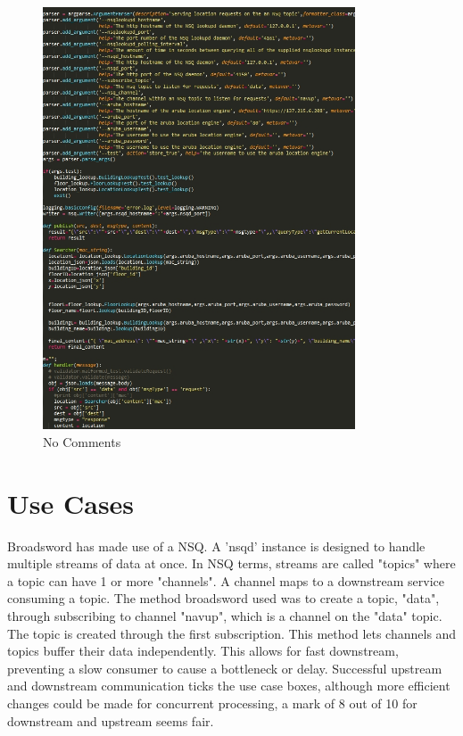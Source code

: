 \documentclass{article}
\begin{document}
\begin{figure}[ht]
  \includegraphics[width=350px]{Images/nocomments.jpg}
  \caption{No Comments}
  \label{Figure showing the lack of comments and explanation}
\end{figure}

\section{Use Cases}

\begin{flushleft}
Broadsword has made use of a NSQ.
A 'nsqd' instance is designed to handle multiple streams of data at once.
In NSQ terms, streams are called "topics" where a topic can have 1 or more "channels".
A channel maps to a downstream service consuming a topic.
The method broadsword used was to create a topic, "data", through subscribing to channel "navup", which is a channel on the "data" topic. The topic is created through the first subscription.
This method lets channels and topics buffer their data independently. This allows for fast downstream, preventing a slow consumer to cause a bottleneck or delay.
\bigskip
Successful upstream and downstream communication ticks the use case boxes, although more efficient changes could be made for concurrent processing, a mark of 8 out of 10 for downstream and upstream seems fair.
\end{flushleft}
\end{document}
